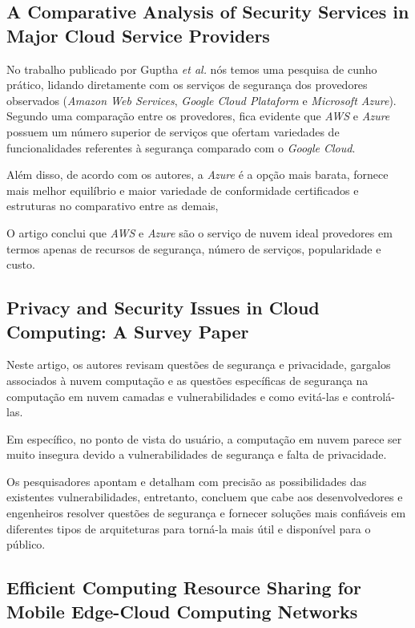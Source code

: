 \documentclass[12pt]{article}
\begin{document}
\subsection{A Comparative Analysis of Security Services in Major Cloud Service Providers \cite{guptha}}

No trabalho publicado por Guptha \emph{et al.} nós temos uma pesquisa de cunho prático, lidando diretamente com os serviços de segurança dos provedores observados (\emph{Amazon Web Services}, \emph{Google Cloud Plataform} e \emph{Microsoft Azure}). Segundo uma comparação entre os provedores, fica evidente que \emph{AWS} e \emph{Azure} possuem um número superior de serviços que ofertam variedades de funcionalidades referentes à segurança comparado com o \emph{Google Cloud}.

Além disso, de acordo com os autores, a \emph{Azure} é a opção mais barata, fornece mais melhor equilíbrio e maior variedade de conformidade
certificados e estruturas no comparativo entre as demais, 

O artigo conclui que \emph{AWS} e \emph{Azure} são o serviço de nuvem ideal provedores em termos apenas de recursos de segurança, número de serviços, popularidade e custo.

\subsection{Privacy and Security Issues in Cloud Computing: A Survey Paper\cite{bamasoud}}

Neste artigo, os autores revisam questões de segurança e privacidade, gargalos associados à nuvem computação e as questões específicas de segurança na computação em nuvem camadas e vulnerabilidades e como evitá-las e controlá-las.

Em específico, no ponto de vista do usuário, a computação em nuvem parece ser muito insegura devido a vulnerabilidades de segurança e falta de privacidade. 

Os pesquisadores apontam e detalham com precisão as possibilidades das existentes vulnerabilidades, entretanto, concluem que cabe aos desenvolvedores e engenheiros resolver questões de segurança e fornecer soluções mais confiáveis em diferentes tipos de arquiteturas para torná-la mais útil e disponível para o público.

\subsection{Efficient Computing Resource Sharing for Mobile Edge-Cloud Computing Networks\cite{zhang}}
\end{document}
